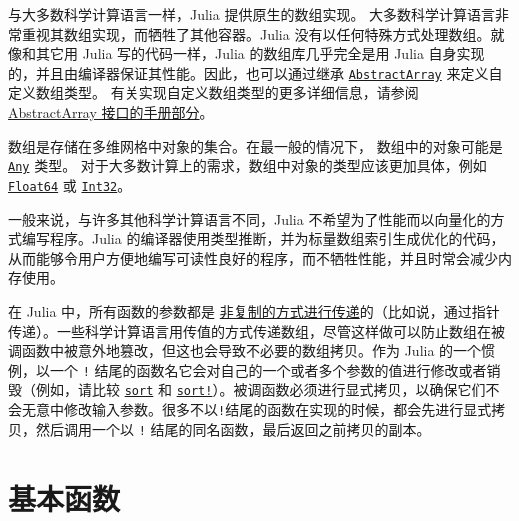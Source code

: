 与大多数科学计算语言一样，Julia 提供原生的数组实现。 大多数科学计算语言非常重视其数组实现，而牺牲了其他容器。Julia 没有以任何特殊方式处理数组。就像和其它用 Julia 写的代码一样，Julia 的数组库几乎完全是用 Julia 自身实现的，并且由编译器保证其性能。因此，也可以通过继承 \hyperlink{6514416309183787338}{\texttt{AbstractArray}} 来定义自定义数组类型。 有关实现自定义数组类型的更多详细信息，请参阅 \hyperlink{9718377734213742156}{AbstractArray 接口的手册部分}。



数组是存储在多维网格中对象的集合。在最一般的情况下， 数组中的对象可能是 \hyperlink{15014186392807667022}{\texttt{Any}} 类型。 对于大多数计算上的需求，数组中对象的类型应该更加具体，例如 \hyperlink{5027751419500983000}{\texttt{Float64}} 或 \hyperlink{10103694114785108551}{\texttt{Int32}}。



一般来说，与许多其他科学计算语言不同，Julia 不希望为了性能而以向量化的方式编写程序。Julia 的编译器使用类型推断，并为标量数组索引生成优化的代码，从而能够令用户方便地编写可读性良好的程序，而不牺牲性能，并且时常会减少内存使用。



在 Julia 中，所有函数的参数都是 \href{https://en.wikipedia.org/wiki/Evaluation\_strategy\#Call\_by\_sharing}{非复制的方式进行传递}的（比如说，通过指针传递）。一些科学计算语言用传值的方式传递数组，尽管这样做可以防止数组在被调函数中被意外地篡改，但这也会导致不必要的数组拷贝。作为 Julia 的一个惯例，以一个 \texttt{!} 结尾的函数名它会对自己的一个或者多个参数的值进行修改或者销毁（例如，请比较 \hyperlink{8473525809131227606}{\texttt{sort}} 和 \hyperlink{12296873681374954808}{\texttt{sort!}}）。被调函数必须进行显式拷贝，以确保它们不会无意中修改输入参数。很多不以\texttt{!}结尾的函数在实现的时候，都会先进行显式拷贝，然后调用一个以 \texttt{!} 结尾的同名函数，最后返回之前拷贝的副本。



\hypertarget{3050591823172658870}{}


\section{基本函数}




